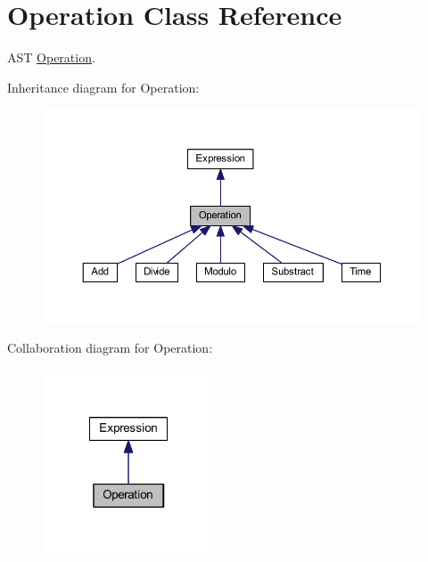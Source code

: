 \hypertarget{class_operation}{\section{Operation Class Reference}
\label{class_operation}
}


A\-S\-T \hyperlink{class_operation}{Operation}.  




Inheritance diagram for Operation\-:\nopagebreak
\begin{figure}[H]
\begin{center}
\leavevmode
\includegraphics[width=350pt]{class_operation__inherit__graph}
\end{center}
\end{figure}


Collaboration diagram for Operation\-:\nopagebreak
\begin{figure}[H]
\begin{center}
\leavevmode
\includegraphics[width=144pt]{class_operation__coll__graph}
\end{center}
\end{figure}
